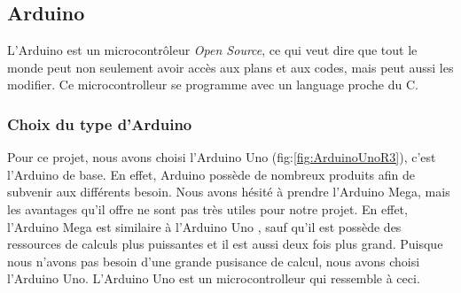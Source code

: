 \documentclass[a4paper,11pt]{report}
\begin{document}
{\subsection{Arduino}
L'Arduino \label{Arduino} \cite{Arduino} est un microcontrôleur \textit{Open Source}, ce qui veut dire que tout le monde peut non seulement avoir accès aux plans et aux codes, mais peut aussi les modifier. Ce microcontrolleur se programme avec un language proche du C. 


\subsubsection{Choix du type d'Arduino}
Pour ce projet, nous avons choisi l'Arduino Uno (fig:\ref{fig:ArduinoUnoR3}), c'est l'Arduino de base. En effet, Arduino possède de nombreux produits afin de subvenir aux différents besoin. Nous avons hésité à prendre l'Arduino Mega, mais les avantages qu'il offre ne sont pas très utiles pour notre projet. En effet, l'Arduino Mega est similaire à l'Arduino Uno , sauf qu'il est possède des ressources de calculs plus puissantes et il est aussi deux fois plus grand. Puisque nous n'avons pas besoin d'une grande pusisance de calcul, nous avons choisi l'Arduino Uno. L'Arduino Uno est un microcontrolleur qui ressemble à ceci.\\

}
\end{document}
